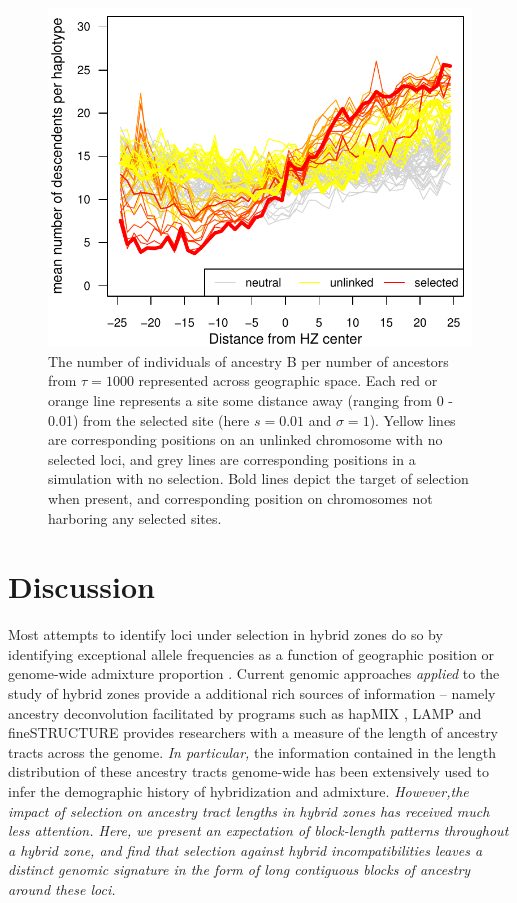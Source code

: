 \documentclass[12pt]{article}
\newcommand{\alisa}[1]{{\em \color{red} #1}}
\begin{document}
\begin{figure}
\includegraphics{figs/number_of_ancestors_tau1000}
\caption{The number of individuals of ancestry B per number of ancestors from $\tau=1000$ represented across geographic space. Each red or orange line represents a site some distance away (ranging from 0 - 0.01) from the selected site (here $s=0.01$ and $\sigma=1$). Yellow lines are corresponding positions on an unlinked chromosome with no selected loci, and grey lines are corresponding positions in a simulation with no selection.  Bold lines depict the target of selection when present, and corresponding position on chromosomes not harboring any selected sites.}\label{Fig:family_size}
\end{figure}


\section{Discussion}

Most attempts to identify loci under selection in hybrid zones do so by identifying exceptional allele frequencies as a function of geographic position or genome-wide admixture proportion \citep{Gompert2012,OTHERS}.  
Current genomic approaches \alisa{applied} to the study of hybrid zones provide a additional rich sources of information -- namely ancestry deconvolution facilitated by programs such as hapMIX \citep{Price2009}, LAMP \citep{Sankararaman2008} and fineSTRUCTURE \citep{Lawson2012} provides researchers with a measure of the length of ancestry tracts across the genome.  \alisa{In particular,} the information contained in the length distribution of these ancestry tracts genome-wide  has been extensively used to infer the demographic history of hybridization and admixture.  \alisa{However,the impact of selection on ancestry tract lengths in hybrid zones has received much less attention. Here, we present an expectation of block-length patterns throughout a hybrid zone, and find that selection against hybrid incompatibilities leaves a distinct genomic signature in the form of long contiguous blocks of ancestry around these loci.} 
\end{document}
